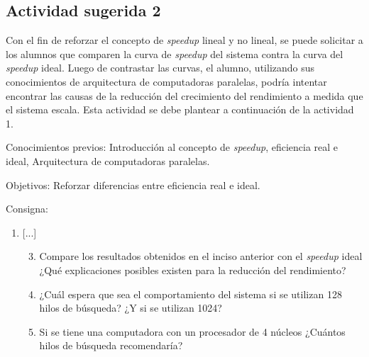 \subsection{Actividad sugerida 2}

Con el fin de reforzar el concepto de \emph{speedup} lineal y no lineal, se
puede solicitar a los alumnos que comparen la curva de \emph{speedup} del
sistema contra la curva del \emph{speedup} ideal. Luego de contrastar las
curvas, el alumno, utilizando sus conocimientos de arquitectura de computadoras
paralelas, podría intentar encontrar las causas de la reducción del crecimiento
del rendimiento a medida que el sistema escala. Esta actividad se debe plantear
a continuación de la actividad 1.

\begin{description}

	\item{Conocimientos previos}: Introducción al concepto de
		\emph{speedup}, eficiencia real e ideal, Arquitectura de
		computadoras paralelas.

	\item{Objetivos}: Reforzar diferencias entre eficiencia real e ideal.

	\item{Consigna}: \begin{enumerate}

	\item{[...]

\begin{enumerate}

	\setcounter{enumii}{2}

	\item{Compare los resultados obtenidos en el inciso anterior con el
		\emph{speedup} ideal ¿Qué explicaciones posibles existen para la
		reducción del rendimiento?}

	\item{¿Cuál espera que sea el comportamiento del sistema si se utilizan
		128 hilos de búsqueda? ¿Y si se utilizan 1024?}

	\item{Si se tiene una computadora con un procesador de 4 núcleos
		¿Cuántos hilos de búsqueda recomendaría?}

\end{enumerate}}

\end{enumerate}

\end{description}


